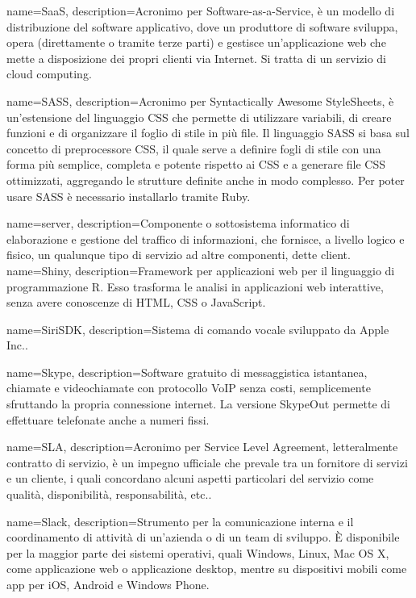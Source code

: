 {
	name=SaaS,
	description={Acronimo per Software-as-a-Service, è un modello di distribuzione del software applicativo, dove un produttore di software sviluppa, opera (direttamente o tramite terze parti) e gestisce un'applicazione web che mette a disposizione dei propri clienti via Internet. Si tratta di un servizio di cloud computing.}
}

{
	name=SASS,
	description={Acronimo per Syntactically Awesome StyleSheets, è un'estensione del linguaggio CSS che permette di utilizzare variabili, di creare funzioni e di organizzare il foglio di stile in più file. Il linguaggio SASS si basa sul concetto di preprocessore CSS, il quale serve a definire fogli di stile con una forma più semplice, completa e potente rispetto ai CSS e a generare file CSS ottimizzati, aggregando le strutture definite anche in modo complesso. Per poter usare SASS è necessario installarlo tramite Ruby.}
}

{
	name=server,
	description={Componente o sottosistema informatico di elaborazione e gestione del traffico di informazioni, che fornisce, a livello logico e fisico, un qualunque tipo di servizio ad altre componenti, dette client.}
}
{
	name=Shiny,
	description={Framework per applicazioni web per il linguaggio di programmazione R. Esso trasforma le analisi in applicazioni web interattive, senza avere conoscenze di HTML, CSS o JavaScript.}
}

{
	name=SiriSDK,
	description={Sistema di comando vocale sviluppato da Apple Inc..}
}

{
	name=Skype,
	description={Software gratuito di messaggistica istantanea, chiamate e videochiamate con protocollo VoIP senza costi, semplicemente sfruttando la propria connessione internet. La versione SkypeOut permette di effettuare telefonate anche a numeri fissi.}
}

{
	name=SLA,
	description={Acronimo per Service Level Agreement, letteralmente contratto di servizio, è un impegno ufficiale che prevale tra un fornitore di servizi e un cliente, i quali concordano alcuni aspetti particolari del servizio come qualità, disponibilità, responsabilità, etc..}
}

{
	name=Slack,
	description={Strumento per la comunicazione interna e il coordinamento di attività di un'azienda o di un team di sviluppo. \MakeUppercase{è} disponibile per la maggior parte dei sistemi operativi, quali Windows, Linux, Mac OS X, come applicazione web o applicazione desktop, mentre su dispositivi mobili come app per iOS, Android e Windows Phone.}
}

